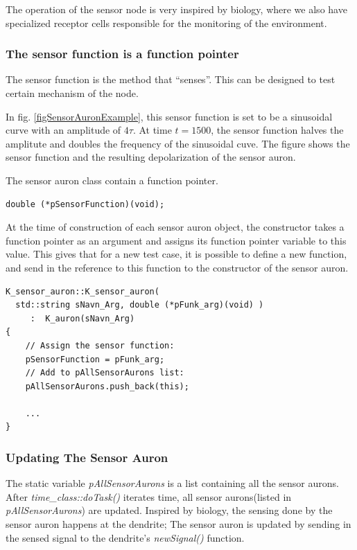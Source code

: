 	The operation of the sensor node is very inspired by biology, where we also have specialized receptor cells responsible for the monitoring of the environment\cite{NeuroscienceExploringTheBrain3edKAP8}.

	\subsubsection{The sensor function is a function pointer}
	The sensor function is the method that ``senses''.
	This can be designed to test certain mechanism of the node.
	
	In fig. \ref{figSensorAuronExample}, this sensor function is set to be a sinusoidal curve with an amplitude of $4 \tau$. 
	At time $t=1500$, the sensor function halves the amplitute and doubles the frequency of the sinusoidal cuve.
	The figure shows the sensor function and the resulting depolarization of the sensor auron.

	The sensor auron class contain a function pointer.
\begin{lstlisting}
double (*pSensorFunction)(void);
\end{lstlisting}
	At the time of construction of each sensor auron object, the constructor takes a function pointer as an argument and assigns its function pointer variable to this value.
	This gives that for a new test case, it is possible to define a new function, and send in the reference to this function to the constructor of the sensor auron.
\begin{lstlisting}
K_sensor_auron::K_sensor_auron(
  std::string sNavn_Arg, double (*pFunk_arg)(void) ) 
     :  K_auron(sNavn_Arg)
{
	// Assign the sensor function:
	pSensorFunction = pFunk_arg;
	// Add to pAllSensorAurons list:
	pAllSensorAurons.push_back(this);

	...
}
\end{lstlisting}

	\subsubsection{Updating The Sensor Auron}
	The static variable \emph{pAllSensorAurons} is a list containing all the sensor aurons.
	After \emph{time\_class::doTask()} iterates time, all sensor aurons(listed in \emph{pAllSensorAurons}) are updated.
	Inspired by biology, the sensing done by the sensor auron happens at the dendrite;
		The sensor auron is updated by sending in the sensed signal to the dendrite's \emph{newSignal()} function.


